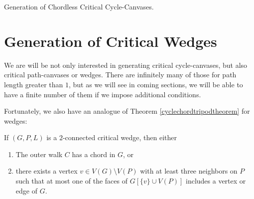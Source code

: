 \begin{algorithm}
\caption{Generation of Chordless Critical Cycle-Canvases.}
\label{alg:chordlesscyclecanvases}
\SetAlgoLined
{}



\end{algorithm}


\section{Generation of Critical Wedges}
\label{sec:generationwedges}

We are will be not only interested in generating critical cycle-canvases, but also critical path-canvases or wedges. 
There are infinitely many of those for path length greater than $1$, but as we will see in coming sections, 
we will be able to have a finite number of them if we impose additional conditions. 

Fortunately, we also have an analogue of Theorem \ref{cyclechordtripodtheorem} for wedges:

\begin{theorem}
If $(G, P, L)$ is a $2$-connected critical wedge, then either

\begin{enumerate}
\item The outer walk $C$ has a chord in $G$, or
\item there exists a vertex $v \in V(G) \setminus V(P)$ with at least three neighbors on $P$ such that at most one of the faces of 
$G[\{v\} \cup V(P)]$ includes a vertex or edge of $G$. 
\end{enumerate}
\end{theorem}

